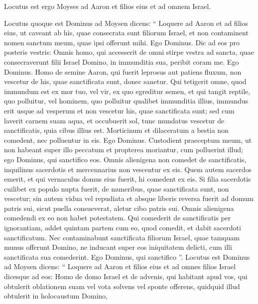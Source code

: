 \begin{biblechapter}
\begin{biblechapter}
\begin{biblechapter}
\begin{biblechapter}
\begin{biblechapter}
\begin{biblechapter}
\begin{biblechapter}
\begin{biblechapter}
\begin{biblechapter}
\begin{biblechapter}
\begin{biblechapter}
\begin{biblechapter}
\begin{biblechapter}
\begin{biblechapter}
\begin{biblechapter}
\begin{biblechapter}
\begin{biblechapter}
\begin{biblechapter}
\begin{biblechapter}
\begin{biblechapter}
\begin{biblechapter}
 \verse Locutus est ergo Moyses ad Aaron et filios eius et ad omnem Israel.
 
\begin{biblechapter}
\verse Locutus quoque est Dominus ad Moysen dicens: 
\verse “ Loquere ad Aaron et ad filios eius, ut caveant ab his, quae consecrata sunt filiorum Israel, et non contaminent nomen sanctum meum, quae ipsi offerunt mihi. Ego Dominus.
 \verse Dic ad eos pro posteris vestris: Omnis homo, qui accesserit de omni stirpe vestra ad sancta, quae consecraverunt filii Israel Domino, in immunditia sua, peribit coram me. Ego Dominus.
 \verse Homo de semine Aaron, qui fuerit leprosus aut patiens fluxum, non vescetur de his, quae sanctificata sunt, donec sanetur. Qui tetigerit omne, quod immundum est ex mor tuo, vel vir, ex quo egreditur semen, 
\verse et qui tangit reptile, quo polluitur, vel hominem, quo polluitur qualibet immunditia illius, 
\verse immundus erit usque ad vesperum et non vescetur his, quae sanctificata sunt; sed cum laverit carnem suam aqua, 
\verse et occubuerit sol, tunc mundatus vescetur de sanctificatis, quia cibus illius est. 
\verse Morticinum et dilaceratum a bestia non comedent, nec polluentur in eis. Ego Dominus. 
\verse Custodient praeceptum meum, ut non habeant super illo peccatum et propterea moriantur, cum polluerint illud; ego Dominus, qui sanctifico eos.
 \verse Omnis alienigena non comedet de sanctificatis, inquilinus sacerdotis et mercennarius non vescentur ex eis. 
\verse Quem autem sacerdos emerit, et qui vernaculus domus eius fuerit, hi comedent ex eis. 
\verse Si filia sacerdotis cuilibet ex populo nupta fuerit, de muneribus, quae sanctificata sunt, non vescetur; 
\verse sin autem vidua vel repudiata et absque liberis reversa fuerit ad domum patris sui, sicut puella consueverat, aletur cibo patris sui. Omnis alienigena comedendi ex eo non habet potestatem.
 \verse Qui comederit de sanctificatis per ignorantiam, addet quintam partem cum eo, quod comedit, et dabit sacerdoti sanctificatum. 
\verse Nec contaminabunt sanctificata filiorum Israel, quae tamquam munus offerunt Domino, 
\verse ne inducant super eos iniquitatem delicti, cum illi sanctificata sua comederint. Ego Dominus, qui sanctifico ”.
 \verse Locutus est Dominus ad Moysen dicens: 
\verse “ Loquere ad Aaron et filios eius et ad omnes filios Israel dicesque ad eos: Homo de domo Israel et de advenis, qui habitant apud vos, qui obtulerit oblationem suam vel vota solvens vel sponte offerens, quidquid illud obtulerit in holocaustum Domino, 

\end{biblechapter}
\end{biblechapter}
\end{biblechapter}
\end{biblechapter}
\end{biblechapter}
\end{biblechapter}
\end{biblechapter}
\end{biblechapter}
\end{biblechapter}
\end{biblechapter}
\end{biblechapter}
\end{biblechapter}
\end{biblechapter}
\end{biblechapter}
\end{biblechapter}
\end{biblechapter}
\end{biblechapter}
\end{biblechapter}
\end{biblechapter}
\end{biblechapter}
\end{biblechapter}
\end{biblechapter}
